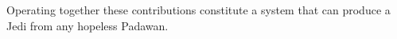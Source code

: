 Operating together these contributions constitute a system that can produce a Jedi from any hopeless Padawan.




